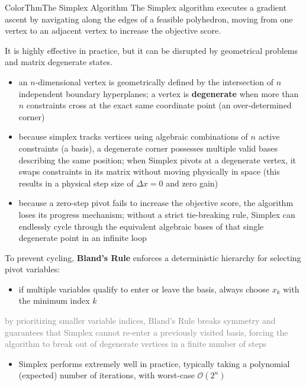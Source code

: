 \documentclass[a4paper, 11pt]{report}
\begin{document}
\begin{cframe}{ColorThm}{The Simplex Algorithm}{}
The Simplex algorithm executes a gradient ascent by navigating along the edges of a feasible polyhedron, moving from one vertex to an adjacent vertex to increase the objective score.

It is highly effective in practice, but it can be disrupted by geometrical problems and matrix degenerate states.

\begin{itemize}   
    \item an $n$-dimensional vertex is geometrically defined by the intersection of $n$ independent boundary hyperplanes; a vertex is \textbf{degenerate} when more than $n$ constraints cross at the exact same coordinate point (an over-determined corner)
    \item because simplex tracks vertices using algebraic combinations of $n$ active constraints (a basis), a degenerate corner possesses multiple valid bases describing the same position; when Simplex pivots at a degenerate vertex, it swaps constraints in its matrix without moving physically in space (this results in a physical step size of $\Delta x = 0$ and zero gain)
    \item because a zero-step pivot fails to increase the objective score, the algorithm loses its progress mechanism; without a strict tie-breaking rule, Simplex can endlessly cycle through the equivalent algebraic bases of that single degenerate point in an infinite loop
\end{itemize}

To prevent cycling, \textbf{Bland's Rule} enforces a deterministic hierarchy for selecting pivot variables:
\begin{itemize}
    \item if multiple variables qualify to enter or leave the basis, always choose  $x_k$  with the minimum index $k$
\end{itemize}

\textcolor{gray}{by prioritizing smaller variable indices, Bland's Rule breaks symmetry and guarantees that Simplex cannot re-enter a previously visited basis, forcing the algorithm to break out of degenerate vertices in a finite number of steps}
\end{cframe}

\begin{itemize}
    \item Simplex performs extremely well in practice, typically taking a polynomial (expected) number of iterations, with worst-case $\mathcal{O}(2^n)$
\end{itemize}
\end{document}

